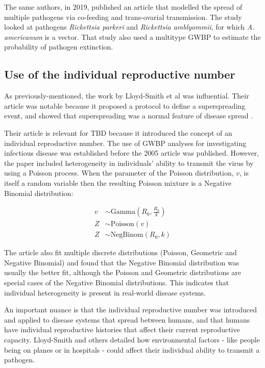 \documentclass{article}
\begin{document}
The same authors, in 2019, published an article that modelled the spread of multiple pathogens via co-feeding and trans-ovarial transmission. The study looked at pathogens \textit{Rickettsia parkeri} and \textit{Rickettsia amblyommii}, for which \textit{A. americanum} is a vector. That study also used a multitype GWBP to estimate the probability of pathogen extinction.

\subsection{Use of the individual reproductive number}

As previously-mentioned, the work by Lloyd-Smith et al was influential. Their article was notable because it proposed a protocol to define a superspreading event, and showed that superspreading was a normal feature of disease spread \cite{LloydSmith2005}.

Their article is relevant for TBD because it introduced the concept of an individual reproductive number. The use of GWBP analyses for investigating infectious disease was established before the 2005 article was published. However, the paper included heterogeneity in individuals' ability to transmit the virus by using a Poisson process. When the parameter of the Poisson distribution, $ v $, is itself a random variable then the resulting Poisson mixture is a Negative Binomial distribution:

\begin{align}\label{PoissonMixture}
    v &\sim \text{Gamma}\left(R_0, \frac{R_0}{k}\right) \nonumber \\
    Z &\sim \text{Poisson}(v) \\
    Z &\sim \text{NegBinom}(R_0, k) \nonumber
\end{align}

The article also fit multiple discrete distributions (Poisson, Geometric and Negative Binomial) and found that the Negative Binomial distribution was usually the better fit, although the Poisson and Geometric distributions are special cases of the Negative Binomial distributions. This indicates that individual heterogeneity is present in real-world disease systems.

An important nuance is that the individual reproductive number was introduced and applied to disease systems that spread between humans, and that humans have individual reproductive histories that affect their current reproductive capacity. Lloyd-Smith and others detailed how environmental factors - like people being on planes or in hospitals - could affect their individual ability to transmit a pathogen.
\end{document}
